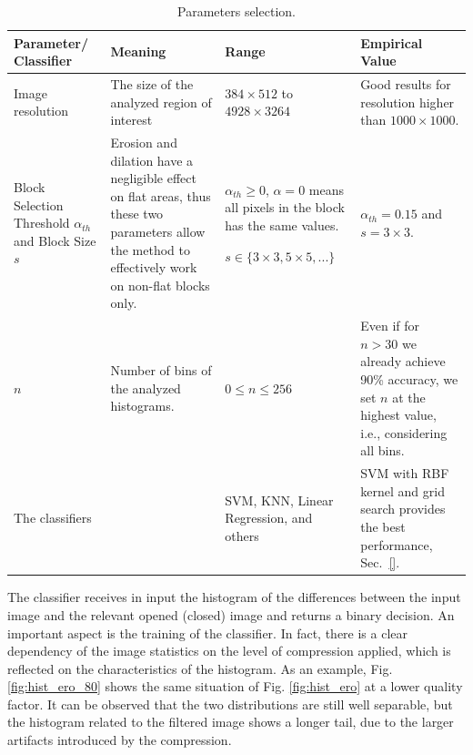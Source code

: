 \documentclass[review]{elsarticle}
\begin{document}
\begin{table}[t!]
	\centering
	\caption{Parameters selection.}
	\label{tab:sensibility}
	\begin{tabular}{p{3.7cm}|p{5cm}|p{3cm}|p{4.5cm}}
		\hline\hline
		\textbf{Parameter/ Classifier} & \textbf{Meaning} & \textbf{Range} &  \textbf{Empirical Value} \\
		\hline
		Image resolution & The size of the analyzed region of interest & $384 \times 512$  to $4928 \times 3264$& Good results for resolution higher than $1000 \times 1000$.\\
		\hline
		Block Selection Threshold $\alpha_{th}$ and Block Size $s$ & Erosion and dilation have a negligible effect on flat areas, thus these two parameters allow the method to effectively work on non-flat blocks only. & $\alpha_{th} \ge 0$, $\alpha = 0$ means all pixels in the block has the same values.
		
		$ s \in \{3 \times 3, 5 \times 5, ...\}$ & $ \alpha_{th} = 0.15$ and $s = 3 \times 3$.\\
		\hline
		$n$ & Number of bins of the analyzed histograms. & $0 \le n \le 256$ & Even if for $n > 30$ we already achieve 90\% accuracy, we set $n$ at the highest value, i.e., considering all bins.\\
		\hline
		The classifiers & & SVM, KNN, Linear Regression, and others & SVM with RBF kernel and grid search provides the best performance, Sec.~\ref{}. \\							
		\hline\hline
	\end{tabular}
\end{table}

The classifier receives in input the histogram of the differences between the input image and the relevant opened (closed) image and returns a binary decision. An important aspect is the training of the classifier. In fact, there is a clear dependency of the image statistics on the level of compression applied, which is reflected on the characteristics of the histogram. As an example, Fig. \ref{fig:hist_ero_80} shows the same situation of Fig. \ref{fig:hist_ero} at a lower quality factor. It can be observed that the two distributions are still well separable, but the histogram related to the filtered image shows a longer tail, due to the larger artifacts introduced by the compression.
\end{document}
